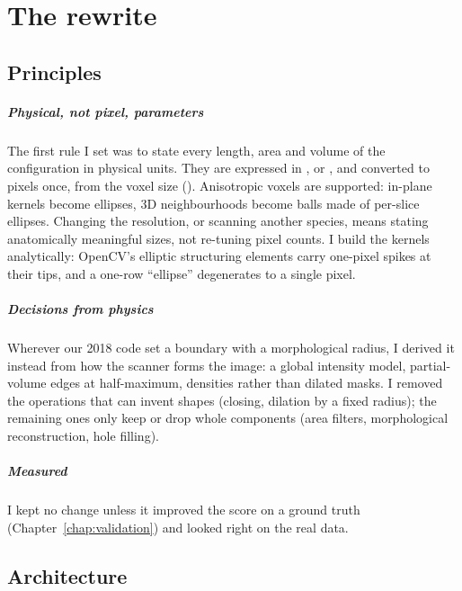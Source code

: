 \chapter{The rewrite}
\label{chap:rewrite}

\section{Principles}

\paragraph{Physical, not pixel, parameters} The first rule I set was to state every length, area and
volume of the configuration in physical units. They are expressed in \um, \umsq{} or \umcube, and converted to pixels once, from the voxel size
(\allowbreak{}). Anisotropic voxels are supported: in-plane kernels become
ellipses, 3D neighbourhoods become balls made of per-slice ellipses. Changing the resolution, or
scanning another species, means stating anatomically meaningful sizes, not re-tuning pixel counts.
I build the kernels analytically: OpenCV's elliptic structuring elements carry one-pixel spikes at
their tips, and a one-row ``ellipse'' degenerates to a single pixel.

\paragraph{Decisions from physics} Wherever our 2018 code set a boundary with a morphological radius, I
derived it instead from how the scanner forms the image: a global intensity model, partial-volume
edges at half-maximum, densities rather than dilated masks. I removed the operations that can invent
shapes (closing, dilation by a fixed radius); the remaining ones only keep or drop whole components
(area filters, morphological reconstruction, hole filling).

\paragraph{Measured} I kept no change unless it improved the score on a ground truth
(Chapter~\ref{chap:validation}) and looked right on the real data.

\section{Architecture}

